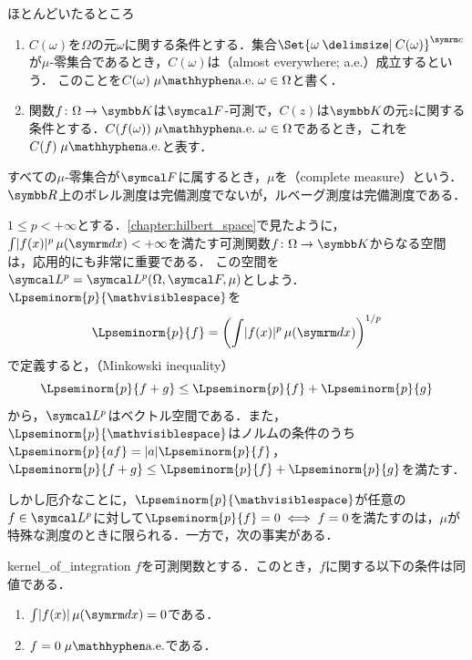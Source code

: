 \documentclass[../../main]{subfiles}
\begin{document}
\begin{definition}{ほとんどいたるところ}{}
  \begin{enumerate}
    \item \(C(\omega)\)を\(\Omega\)の元\(\omega\)に関する条件とする．集合\(\scomp{\Set{\omega\given C(\omega)}}\)が\(\mu\)‐零集合であるとき，\(C(\omega)\)は（almost everywhere; a{.}e{.}）成立するという．
      このことを\(C(\omega)\almosteverywhere[\mu][\omega\in\Omega]\)と書く．
    \item 関数\(f\colon\Omega\to\numset{K}\)は\(\sigmaalg{F}\)‐可測で，\(C(z)\)は\(\numset{K}\)の元\(z\)に関する条件とする．\(C(f(\omega))\almosteverywhere[\mu][\omega\in\Omega]\)であるとき，これを\(C(f)\almosteverywhere[\mu]\)と表す．
  \end{enumerate}
\end{definition}

\begin{note}
  すべての\(\mu\)‐零集合が\(\sigmaalg{F}\)に属するとき，\(\mu\)を（complete measure）という．
  \(\numset{R}\)上のボレル測度は完備測度でないが，ルベーグ測度は完備測度である．
\end{note}

\(1\leq p<+\infty\)とする．\cref{chapter:hilbert_space}で見たように，\(\int\abs{f(x)}^p\measured[x]{\mu}<+\infty\)を満たす可測関数\(f\colon\Omega\to\numset{K}\)からなる空間は，応用的にも非常に重要である．
この空間を\(\Lebesgue*{p}=\Lebesgue*{p}(\Omega,\sigmaalg{F},\mu)\)としよう．\(\Lpseminorm{p}{\holder}\)を
\[
  \Lpseminorm{p}{f} = \pqty*{\int\abs{f(x)}^p\measured[x]{\mu}}^{1/p}
\]
で定義すると，（Minkowski inequality）
\begin{equation}
  \label{equation:minkowski}
  \Lpseminorm{p}{f+g} \leq \Lpseminorm{p}{f}+\Lpseminorm{p}{g}
\end{equation}
から，\(\Lebesgue*{p}\)はベクトル空間である．また，\(\Lpseminorm{p}{\holder}\)はノルムの条件のうち\(\Lpseminorm{p}{af}=\abs{a}\Lpseminorm{p}{f}\)，\(\Lpseminorm{p}{f+g}\leq\Lpseminorm{p}{f}+\Lpseminorm{p}{g}\)を満たす．

しかし厄介なことに，\(\Lpseminorm{p}{\holder}\)が任意の\(f\in\Lebesgue*{p}\)に対して\(\Lpseminorm{p}{f}=0\iff f=0\)を満たすのは，\(\mu\)が特殊な測度のときに限られる．一方で，次の事実がある．

\begin{proposition}{}{kernel_of_integration}
  \(f\)を可測関数とする．このとき，\(f\)に関する以下の条件は同値である．
  \begin{enumerate}
    \item \(\int\abs{f(x)}\measured[x]{\mu}=0\)である．
    \item \(f=0\almosteverywhere[\mu]\)である．
  \end{enumerate}
\end{proposition}
\end{document}
